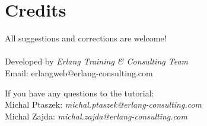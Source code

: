 \section{Credits}
All suggestions and corrections are welcome! \\ \\
\noindent
Developed by \emph{Erlang Training \& Consulting Team} \\
Email: erlangweb@erlang-consulting.com \newline
$ $

\noindent
If you have any questions to the tutorial:\\
Michal Ptaszek: {\it michal.ptaszek@erlang-consulting.com}\\
Michal Zajda: {\it michal.zajda@erlang-consulting.com}
